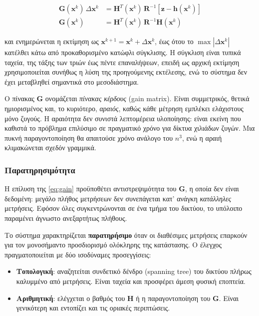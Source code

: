 \begin{align}
\mathbf{G}(\mathbf{x}^{k}) \, \Delta \mathbf{x}^{k}
  &= \mathbf{H}^{T}(\mathbf{x}^{k}) \, \mathbf{R}^{-1}
     \left[\mathbf{z} - \mathbf{h}(\mathbf{x}^{k})\right] \\
\mathbf{G}(\mathbf{x}^{k})
  &= \mathbf{H}^{T}(\mathbf{x}^{k}) \, \mathbf{R}^{-1} \mathbf{H}(\mathbf{x}^{k})
\label{eq:gain}
\end{align}

και ενημερώνεται η εκτίμηση ως $\mathbf{x}^{k+1} = \mathbf{x}^{k} + \Delta \mathbf{x}^{k}$,
έως ότου το $\max|\Delta \mathbf{x}^{k}|$ κατέλθει κάτω από προκαθορισμένο κατώφλι
σύγκλισης. Η σύγκλιση είναι τυπικά ταχεία, της τάξης των τριών έως πέντε επαναλήψεων,
επειδή ως αρχική εκτίμηση χρησιμοποιείται συνήθως η λύση της προηγούμενης εκτέλεσης, ενώ το
σύστημα δεν έχει μεταβληθεί σημαντικά στο μεσοδιάστημα.

Ο πίνακας $\mathbf{G}$ ονομάζεται \emph{πίνακας κέρδους} (gain matrix). Είναι συμμετρικός,
θετικά ημιορισμένος και, το κυριότερο, \emph{αραιός}, καθώς κάθε μέτρηση εμπλέκει ελάχιστους
μόνο ζυγούς. Η αραιότητα δεν συνιστά λεπτομέρεια υλοποίησης: είναι εκείνη που καθιστά το
πρόβλημα επιλύσιμο σε πραγματικό χρόνο για δίκτυα χιλιάδων ζυγών. Μια πυκνή παραγοντοποίηση
θα απαιτούσε χρόνο ανάλογο του $n^3$, ενώ η αραιή κλιμακώνεται σχεδόν γραμμικά.

\subsubsection*{Παρατηρησιμότητα}

Η επίλυση της \eqref{eq:gain} προϋποθέτει αντιστρεψιμότητα του $\mathbf{G}$, η οποία δεν
είναι δεδομένη: μεγάλο πλήθος μετρήσεων δεν συνεπάγεται κατ' ανάγκη \emph{κατάλληλες}
μετρήσεις. Εφόσον όλες συγκεντρώνονται σε ένα τμήμα του δικτύου, το υπόλοιπο παραμένει
άγνωστο ανεξαρτήτως πλήθους.

Το σύστημα χαρακτηρίζεται \textbf{παρατηρήσιμο} όταν οι διαθέσιμες μετρήσεις επαρκούν για
τον μονοσήμαντο προσδιορισμό ολόκληρης της κατάστασης. Ο έλεγχος πραγματοποιείται με δύο
ισοδύναμες προσεγγίσεις:

\begin{itemize}
\item \textbf{Τοπολογική}: αναζητείται συνδετικό δένδρο (spanning tree) του δικτύου πλήρως
      καλυμμένο από μετρήσεις. Είναι ταχεία και προσφέρει άμεση φυσική εποπτεία.
\item \textbf{Αριθμητική}: ελέγχεται ο βαθμός του $\mathbf{H}$ ή η παραγοντοποίηση του
      $\mathbf{G}$. Είναι γενικότερη και εντοπίζει και τις οριακές περιπτώσεις.
\end{itemize}

